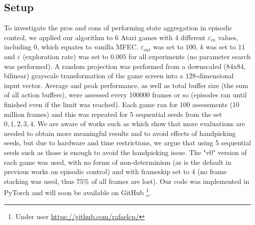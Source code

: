 \documentclass{article}
\begin{document}
\subsection{Setup}
To investigate the pros and cons of performing state aggregation in episodic control, we applied our algorithm to 6 Atari games with 4 different $\varepsilon_{in}$ values, including $0$, which equates to vanilla MFEC. $\varepsilon_{out}$ was set to $100$, $k$ was set to $11$ and $\varepsilon$ (exploration rate) was set to $0.005$ for all experiments (no parameter search was performed). A random projection was performed from a downscaled ($84$x$84$, bilinear) grayscale transformation of the game screen into a $128$-dimensional input vector. Average and peak performance, as well as total buffer size (the sum of all action buffers), were assessed every 100000 frames or so (episodes ran until finished even if the limit was reached). Each game ran for 100 assessments (10 million frames) and this was repeated for 5 sequential seeds from the set ${0,1,2,3,4}$. We are aware of works such as \cite{henderson2018deep} which show that more evaluations are needed to obtain more meaningful results and to avoid effects of handpicking seeds, but due to hardware and time restrictions, we argue that using 5 sequential seeds such as those is enough to avoid the handpicking issue. The "v0" version of each game was used, with no forms of non-determinism (as is the default in previous works on episodic control) and with frameskip set to $4$ (no frame stacking was used, thus $75\%$ of all frames are lost). Our code was implemented in PyTorch \cite{paszke2019pytorch} and will soon be available on GitHub \footnote{Under user  \url{https://github.com/rafaelcp/}}. 
\end{document}
